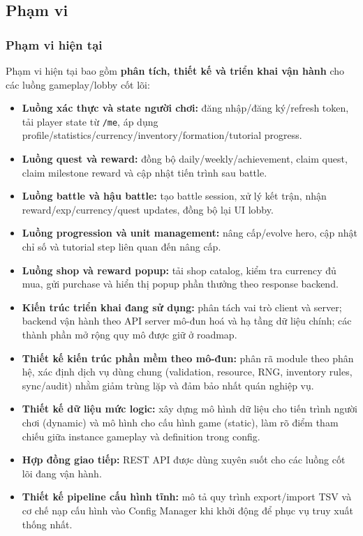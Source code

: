 \subsection{Phạm vi}

\subsubsection{Phạm vi hiện tại}

Phạm vi hiện tại bao gồm \textbf{phân tích, thiết kế và triển khai vận hành} cho các luồng gameplay/lobby cốt lõi:

\begin{itemize}
    \item \textbf{Luồng xác thực và state người chơi:}
    đăng nhập/\allowbreak đăng ký/\allowbreak refresh token, tải player state từ \texttt{/me}, áp dụng profile/\allowbreak statistics/\allowbreak currency/\allowbreak inventory/\allowbreak formation/\allowbreak tutorial progress.
    \item \textbf{Luồng quest và reward:}
    đồng bộ daily/\allowbreak weekly/\allowbreak achievement, claim quest, claim milestone reward và cập nhật tiến trình sau battle.
    \item \textbf{Luồng battle và hậu battle:}
    tạo battle session, xử lý kết trận, nhận reward/\allowbreak exp/\allowbreak currency/\allowbreak quest updates, đồng bộ lại UI lobby.
    \item \textbf{Luồng progression và unit management:}
    nâng cấp/\allowbreak evolve hero, cập nhật chỉ số và tutorial step liên quan đến nâng cấp.
    \item \textbf{Luồng shop và reward popup:}
    tải shop catalog, kiểm tra currency đủ mua, gửi purchase và hiển thị popup phần thưởng theo response backend.
    \item \textbf{Kiến trúc triển khai đang sử dụng:}
    phân tách vai trò client và server; backend vận hành theo API server mô-đun hoá và hạ tầng dữ liệu chính; các thành phần mở rộng quy mô được giữ ở roadmap.
    \item \textbf{Thiết kế kiến trúc phần mềm theo mô-đun:}
    phân rã module theo phân hệ, xác định dịch vụ dùng chung (validation, resource, RNG, inventory rules, sync/\allowbreak audit) nhằm giảm trùng lặp và đảm bảo nhất quán nghiệp vụ.
    \item \textbf{Thiết kế dữ liệu mức logic:}
    xây dựng mô hình dữ liệu cho tiến trình người chơi (dynamic) và mô hình cho cấu hình game (static), làm rõ điểm tham chiếu giữa instance gameplay và definition trong config.
    \item \textbf{Hợp đồng giao tiếp:}
    REST API được dùng xuyên suốt cho các luồng cốt lõi đang vận hành.
    \item \textbf{Thiết kế pipeline cấu hình tĩnh:}
    mô tả quy trình export/\allowbreak import TSV và cơ chế nạp cấu hình vào Config Manager khi khởi động để phục vụ truy xuất thống nhất.
\end{itemize}

